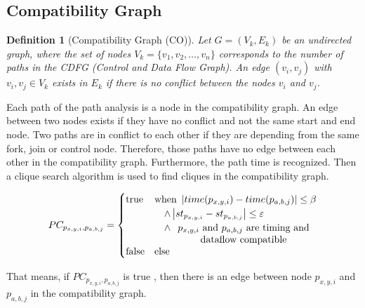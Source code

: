 \documentclass[conference]{IEEEtran}
\newtheorem{definition}{Definition}
\begin{document}

\subsection{Compatibility Graph}
\label{subsec: compatibility graph}
\begin{definition}[Compatibility Graph (CO)]
\label{def:compatibility}
Let $G = (V_k, E_k)$ be an undirected graph, where the set of nodes $V_k = \{v_1, v_2, \ldots, v_n\}$ corresponds to the number of paths in the CDFG (Control and Data Flow Graph). An edge $(v_i, v_j)$ with $v_i, v_j \in V_k$ exists in $E_k$ if there is no conflict between the nodes $v_i$ and $v_j$.
\end{definition}

Each path of the path analysis is a node in the compatibility graph. An edge between two nodes exists if they have no conflict and not the same start and end node. Two paths are in conflict to each other if they are depending from the same fork, join or control node. Therefore, those paths have no edge between each other in the compatibility graph. Furthermore, the path time is recognized. Then a clique search algorithm is used to find cliques in the compatibility graph. 

\[
PC_{p_{x,y,i},p_{a,b,j}} =
\begin{cases}
\text{true} & \text{when } \left| time(p_{x,y,i}) - time(p_{a,b,j}) \right| \leq \beta \\
            & \quad \land \left| st_{p_{x,y,i}} - st_{p_{a,b,j}} \right| \leq \varepsilon \\
            & \quad \land\ \parbox[t]{5cm}{\centering $p_{x,y,i}$ and $p_{a,b,j}$ are timing and dataflow compatible} \\
\text{false} & \text{else}
\end{cases}
\]



That means, if $PC_{p_{x,y,i},p_{a,b,j}}$ is true , then there is an edge between node $p_{x,y,i}$ and $p_{a,b,j}$ in the compatibility graph.
\end{document}
